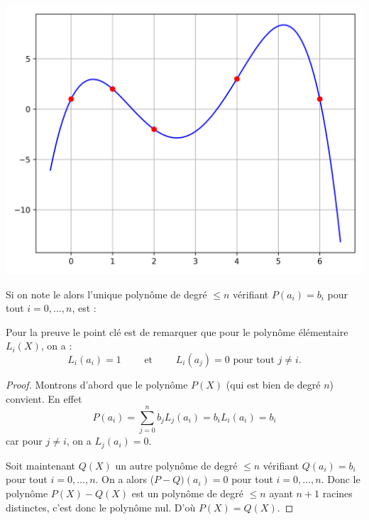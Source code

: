\documentclass[11pt,class=report,crop=false]{standalone}
\begin{document}
\begin{center}
  \includegraphics[scale=\myscale,scale=0.5]{figures/approx-lagrange-01}
\end{center}

\begin{proposition}
Si on note le 
alors l'unique polynôme de degré $\le n$ vérifiant $P(a_i) = b_i$ pour tout $i=0,\ldots,n$, est :
\end{proposition}

Pour la preuve le point clé est de remarquer que pour le polynôme élémentaire $L_i(X)$, on a :
$$L_i(a_i) = 1 \qquad \text{ et } \qquad L_i(a_j) = 0 \text{ pour tout } j\neq i.$$ 

\begin{proof}
Montrons d'abord que le polynôme $P(X)$ (qui est bien de degré $n$) convient. En effet 
$$P(a_i) =  \sum_{j=0}^n b_j L_j(a_i) = b_i L_i(a_i) = b_i$$
car pour $j \neq i$, on a $L_j(a_i) = 0$.

Soit maintenant $Q(X)$ un autre polynôme de degré $\le n$ vérifiant $Q(a_i) = b_i$ pour tout $i=0,\ldots,n$.
On a alors ($P-Q)(a_i)=0$ pour tout $i=0,\ldots,n$. Donc le polynôme $P(X)-Q(X)$ est un polynôme de degré $\le n$ ayant 
$n+1$ racines distinctes, c'est donc le polynôme nul. D'où $P(X)=Q(X)$.
\end{proof}
\end{document}
